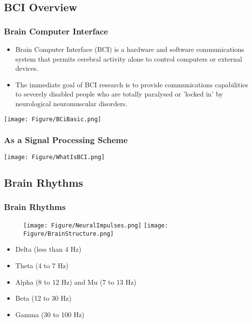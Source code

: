 \documentclass[11pt]{beamer}
\begin{document}
\subsection{BCI Overview} %
\begin{frame}%
\frametitle{Brain Computer Interface}
\begin{itemize}
[ball] 
\item Brain Computer Interface (BCI) is a hardware and software communications system that permits cerebral activity alone to control computers or external devices.
\item The immediate goal of BCI research is to provide communications capabilities to severely disabled people who are totally paralysed or 'locked in' by neurological neuromuscular disorders.
\end{itemize}
\begin{center}
\texttt{[image: Figure/BCiBasic.png]}
\end{center}
\end{frame}

\begin{frame}
\frametitle{As a Signal Processing Scheme}

\texttt{[image: Figure/WhatIsBCI.png]}

\end{frame}

\subsection{Brain Rhythms}
\begin{frame}
\frametitle{Brain Rhythms}
\begin{figure}
\texttt{[image: Figure/NeuralImpulses.png]}
\hfill
\texttt{[image: Figure/BrainStructure.png]}
\end{figure}
\begin{itemize}
[ball] 
\item Delta (less than 4 Hz)
\item Theta (4 to 7 Hz)
\item Alpha (8 to 12 Hz) and Mu (7 to 13 Hz)
\item Beta (12 to 30 Hz)
\item Gamma (30 to 100 Hz)
\end{itemize}
\end{frame}
\end{document}
